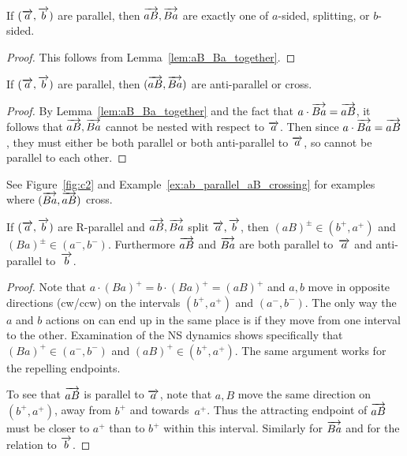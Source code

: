 \begin{lemma}
\label{lem:trichotomy_ab}
If $(\overrightarrow{a},\overrightarrow{b})$ are parallel, then $\overrightarrow{aB},\overrightarrow{Ba}$ are
exactly one of $a$-sided, splitting, or $b$-sided.
\end{lemma}
\begin{proof}
This follows from Lemma~\ref{lem:aB_Ba_together}.
\end{proof}

\begin{lemma}
\label{lem:aB_bA_antiparallel_cross}
If $(\overrightarrow{a},\overrightarrow{b})$ are parallel, then $(\overrightarrow{aB},\overrightarrow{Ba})$  are anti-parallel or cross.
\end{lemma}
\begin{proof}
By Lemma~\ref{lem:aB_Ba_together} and the fact that $a \cdot \overrightarrow{Ba} = \overrightarrow{aB}$,
it follows that $\overrightarrow{aB},\overrightarrow{Ba}$ cannot be nested with respect to $\overrightarrow{a}$.
Then since $a \cdot \overrightarrow{Ba} = \overrightarrow{aB}$, they must either be both
parallel or both anti-parallel to $\overrightarrow{a}$, so cannot be parallel to each other.
\end{proof}

See Figure~\ref{fig:c2} and Example~\ref{ex:ab_parallel_aB_crossing} for examples where $(\overrightarrow{Ba},\overrightarrow{aB})$ cross.

\begin{lemma}
\label{lem:splitting_specific}
If $(\overrightarrow{a},\overrightarrow{b})$ are R-parallel and $\overrightarrow{aB},\overrightarrow{Ba}$ split
$\overrightarrow{a},\overrightarrow{b}$,
then $(aB)^{\pm} \in (b^+, a^+)$ and $(Ba)^{\pm} \in (a^-,b^-)$.
Furthermore $\overrightarrow{aB}$ and $\overrightarrow{Ba}$ are both parallel to~$\overrightarrow{a}$
and anti-parallel to~$\overrightarrow{b}$.
\end{lemma}
\begin{proof}
  Note that $a \cdot (Ba)^+ = b \cdot (Ba)^+ = (aB)^+$ and $a,b$ move
  in opposite directions (cw/ccw) on the intervals $(b^+,a^+)$ and
  $(a^-,b^-)$. The only way the $a$ and $b$ actions on can end up in
  the same place is if they move from one interval to the other.
  Examination of the NS dynamics shows specifically that $(Ba)^+ \in
  (a^-,b^-)$ and $(aB)^+ \in (b^+, a^+)$. The same argument works for
  the repelling endpoints.

  To see that $\overrightarrow{aB}$ is parallel to $\overrightarrow{a}$, note that $a,B$
  move the same direction on $(b^+,a^+)$, away from $b^+$ and
  towards~$a^+$. Thus the attracting endpoint of $\overrightarrow{aB}$ must be
  closer to $a^+$ than to $b^+$ within this interval. Similarly for
  $\overrightarrow{Ba}$ and for the relation to $\overrightarrow{b}$.
\end{proof}


